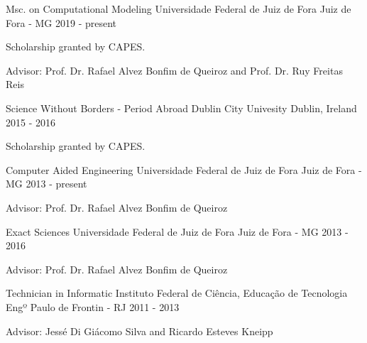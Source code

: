 \begin{cventries}

  \cventry
    {Msc. on Computational Modeling} %
    {Universidade Federal de Juiz de Fora} %
    {Juiz de Fora - MG} %
    {2019 - present} %
    {
      \begin{cvitems} %
        \item {Scholarship granted by CAPES.}
        \item {Advisor: Prof. Dr. Rafael Alvez Bonfim de Queiroz and Prof. Dr. Ruy Freitas Reis}
      \end{cvitems}
    }
    
  \cventry
    {Science Without Borders - Period Abroad} %
    {Dublin City Univesity} %
    {Dublin, Ireland} %
    {2015 - 2016} %
    {
      \begin{cvitems} %
        \item {Scholarship granted by CAPES.}
      \end{cvitems}
    }

  \cventry
    {Computer Aided Engineering} %
    {Universidade Federal de Juiz de Fora} %
    {Juiz de Fora - MG} %
    {2013 - present} %
    {
      \begin{cvitems} %
        \item {Advisor: Prof. Dr. Rafael Alvez Bonfim de Queiroz}
      \end{cvitems}
    }
    
  \cventry
    {Exact Sciences} %
    {Universidade Federal de Juiz de Fora} %
    {Juiz de Fora - MG} %
    {2013 - 2016} %
    {
      \begin{cvitems} %
        \item {Advisor: Prof. Dr. Rafael Alvez Bonfim de Queiroz}
      \end{cvitems}
    }

  \cventry
    {Technician in Informatic} %
    {Instituto Federal de Ciência, Educação de Tecnologia} %
    {Engº Paulo de Frontin - RJ} %
    {2011 - 2013} %
    {
      \begin{cvitems} %
        \item {Advisor: Jessé Di Giácomo Silva and Ricardo Esteves Kneipp}
      \end{cvitems}
    }

\end{cventries}
